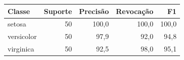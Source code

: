 
\begin{tabular}{lrrrr}
\toprule
\textbf{Classe} & \textbf{Suporte} & \textbf{Precisão} & \textbf{Revocação} & \textbf{F1} \\
\midrule
setosa & 50 & 100{,}0 & 100{,}0 & 100{,}0 \\
versicolor & 50 & 97{,}9 & 92{,}0 & 94{,}8 \\
virginica & 50 & 92{,}5 & 98{,}0 & 95{,}1 \\
\bottomrule
\end{tabular}
